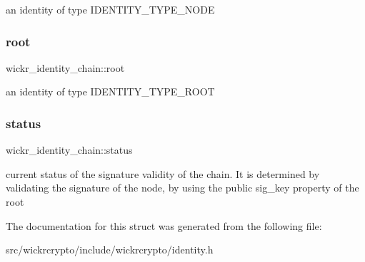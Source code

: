 an identity of type \textquotesingle{}I\+D\+E\+N\+T\+I\+T\+Y\+\_\+\+T\+Y\+P\+E\+\_\+\+N\+O\+DE\textquotesingle{} \mbox{\label{structwickr__identity__chain_a0982b1510591138e2e7d0546741bc6e0}} 
\subsubsection{\texorpdfstring{root}{root}}
{\footnotesize\ttfamily wickr\+\_\+identity\+\_\+chain\+::root}

an identity of type \textquotesingle{}I\+D\+E\+N\+T\+I\+T\+Y\+\_\+\+T\+Y\+P\+E\+\_\+\+R\+O\+OT\textquotesingle{} \mbox{\label{structwickr__identity__chain_acee365b411eb4a7e7c68c115d60e166e}} 
\subsubsection{\texorpdfstring{status}{status}}
{\footnotesize\ttfamily wickr\+\_\+identity\+\_\+chain\+::status}

current status of the signature validity of the chain. It is determined by validating the signature of the node, by using the public \textquotesingle{}sig\+\_\+key\textquotesingle{} property of the root 

The documentation for this struct was generated from the following file\+:\begin{DoxyCompactItemize}
\item 
src/wickrcrypto/include/wickrcrypto/identity.\+h\end{DoxyCompactItemize}
